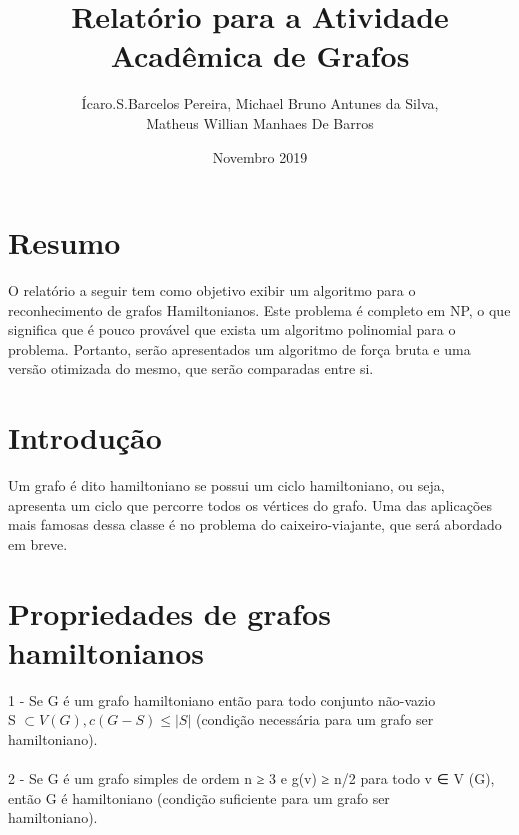 \documentclass{article}
\title{Relatório para a Atividade Acadêmica de Grafos}
\author{Ícaro.S.Barcelos Pereira, Michael Bruno Antunes da Silva,\\Matheus Willian Manhaes De Barros}
\date{Novembro 2019}
\begin{document}
\maketitle

\section{Resumo}

\hspace{\parindent}O relatório a seguir tem como objetivo exibir um algoritmo para o reconhecimento de grafos Hamiltonianos. Este problema é completo em NP, o que significa que é pouco provável que exista um algoritmo polinomial para o\\ problema. Portanto, serão apresentados um algoritmo de força bruta e uma versão otimizada do mesmo, que serão comparadas entre si.\par

\pagebreak
\section{Introdução}
\hspace{\parindent}Um grafo é dito hamiltoniano se possui um ciclo hamiltoniano, ou seja,\\ apresenta um ciclo que percorre todos os vértices do grafo. Uma das aplicações mais famosas dessa classe é no problema do caixeiro-viajante, que será abordado em breve.\par

\section{Propriedades de grafos hamiltonianos}
1 - Se G é um grafo hamiltoniano então para todo conjunto não-vazio \\S $\subset V (G), c(G - S) ≤ |S| $ (condição necessária para um grafo ser hamiltoniano).\\
\\2 - Se G é um grafo simples de ordem n ≥ 3 e g(v) ≥ n/2 para todo v ∈ V (G), então G é hamiltoniano (condição suficiente para um grafo ser \\hamiltoniano).\\
\end{document}
